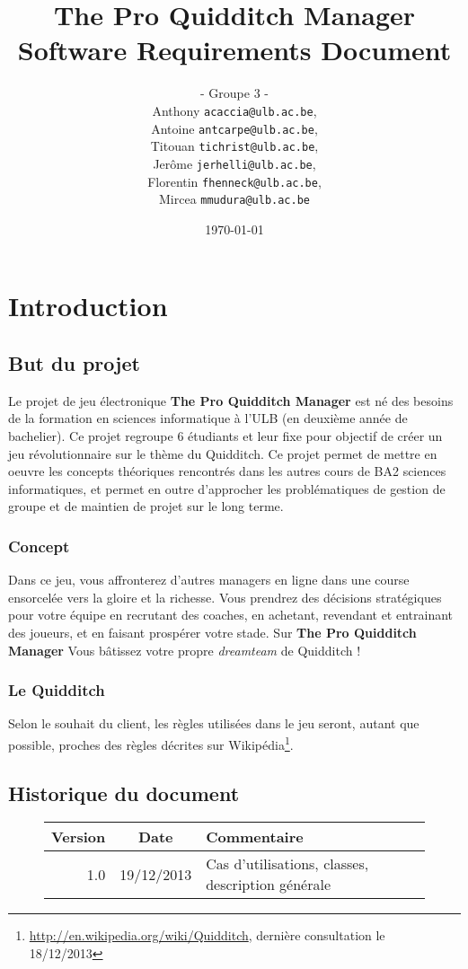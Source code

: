 \documentclass[a4paper, 11pt]{report}
\author{
- Groupe 3 -\\
Anthony \bsc{Caccia} \texttt{acaccia@ulb.ac.be},\\
Antoine \bsc{Carpentier} \texttt{antcarpe@ulb.ac.be},\\
Titouan \bsc{Christophe} \texttt{tichrist@ulb.ac.be},\\
Jerôme \bsc{Hellinckx} \texttt{jerhelli@ulb.ac.be},\\
Florentin \bsc{Hennecker} \texttt{fhenneck@ulb.ac.be},\\
Mircea \bsc{Mudura} \texttt{mmudura@ulb.ac.be}\\
}
\title{The Pro Quidditch Manager\\Software Requirements Document}
\date{\today}
\begin{document}
\maketitle
\tableofcontents

\chapter{Introduction}

\section{But du projet}
Le projet de jeu électronique \textbf{The Pro Quidditch Manager} est né des besoins de la formation
en sciences informatique à l'ULB (en deuxième année de bachelier). Ce projet regroupe 6 étudiants et leur fixe pour objectif de créer un jeu révolutionnaire sur le thème du Quidditch. Ce projet permet
de mettre en oeuvre les concepts théoriques rencontrés dans les autres cours de 
BA2 sciences informatiques, et permet en outre d'approcher les problématiques de 
gestion de groupe et de maintien de projet sur le long terme.

\subsection{Concept}
Dans ce jeu, vous affronterez d'autres \gls{manager}s en ligne dans une course ensorcelée
vers la gloire et la richesse. Vous prendrez des décisions stratégiques pour votre
équipe en recrutant des coaches, en achetant, revendant et entrainant des joueurs, et en faisant prospérer votre stade. 
Sur \textbf{The Pro Quidditch Manager} Vous bâtissez votre propre \textit{dreamteam} de Quidditch !

\subsection{Le Quidditch}
Selon le souhait du client, les règles utilisées dans le jeu seront, autant que possible, proches des règles décrites sur Wikipédia\footnote{\url{http://en.wikipedia.org/wiki/Quidditch}, dernière consultation le 18/12/2013}.

\section{Historique du document}
\begin{figure}[h!]
\centering
\begin{tabular}{| r | c | l |}
\hline
\textbf{Version} & \textbf{Date} & \textbf{Commentaire} \\
\hline
1.0 & 19/12/2013 & Cas d'utilisations, classes, description générale\\
\hline
\end{tabular}
\end{figure}
\end{document}
